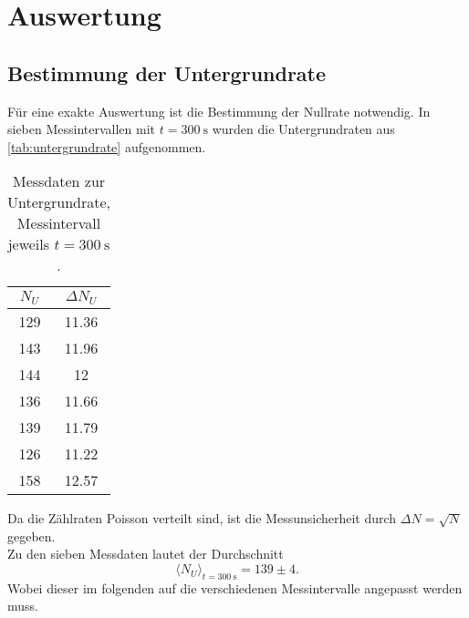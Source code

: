 \section{Auswertung}
\label{sec:Auswertung}

\subsection{Bestimmung der Untergrundrate}
\label{sec:aus:untergrundrate}

Für eine exakte Auswertung ist die Bestimmung der Nullrate notwendig.
In sieben Messintervallen mit $t = \SI{300}{\second}$ wurden die 
Untergrundraten aus \autoref{tab:untergrundrate} aufgenommen.
\begin{table}
	\centering
	\caption{Messdaten zur Untergrundrate, Messintervall jeweils $t = \SI{300}{\second}$.}
	\label{tab:untergrundrate}
	\begin{tabular}{c c}
		\toprule
		$N_U$ & $\Delta N_U$ \\
		\midrule
		129 & 11.36 \\
		143 & 11.96 \\
		144 & 12 \\
		136 & 11.66 \\
		139 & 11.79 \\
		126 & 11.22 \\
		158 & 12.57 \\
		\bottomrule
	\end{tabular}
\end{table}

\noindent
Da die Zählraten Poisson verteilt sind, ist die Messunsicherheit durch $\Delta N = \sqrt{N}$ 
gegeben.
\\
Zu den sieben Messdaten lautet der Durchschnitt
\begin{equation}
	\langle N_U \rangle_{t = \SI{300}{\second}} = 139 \pm 4.
\end{equation}
Wobei dieser im folgenden auf die verschiedenen Messintervalle angepasst werden muss.
